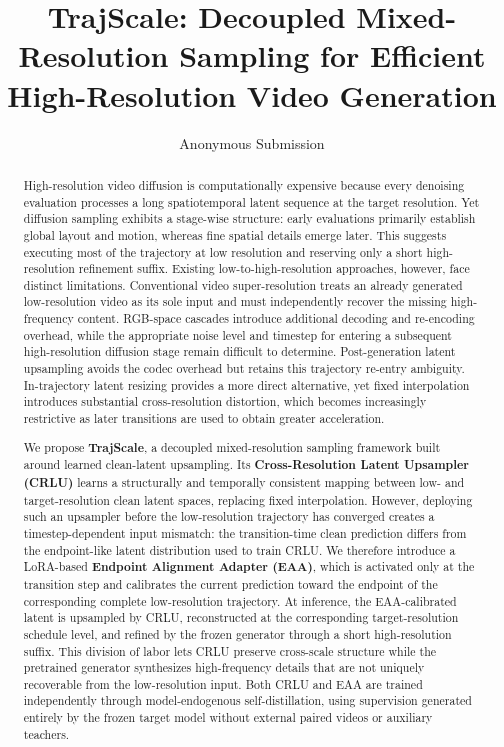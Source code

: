 \documentclass[letterpaper]{article} %
\title{TrajScale: Decoupled Mixed-Resolution Sampling for Efficient High-Resolution Video Generation}
\author{Anonymous Submission}
\begin{document}
\maketitle

\begin{abstract}
High-resolution video diffusion is computationally expensive because every denoising evaluation processes a
 long spatiotemporal latent sequence at the target resolution. Yet diffusion sampling exhibits a stage-wise structure:
 early evaluations primarily establish global layout and motion, whereas fine spatial details emerge later.
 This suggests executing most of the trajectory at low resolution and reserving only a short
 high-resolution refinement suffix. Existing low-to-high-resolution approaches, however, face distinct limitations.
 Conventional video super-resolution treats an already generated low-resolution video as its sole input and must
 independently recover the missing high-frequency content. RGB-space cascades introduce additional decoding and
 re-encoding overhead, while the appropriate noise level and timestep for entering a subsequent high-resolution diffusion
 stage remain difficult to determine. Post-generation latent upsampling avoids the codec overhead but retains this
 trajectory re-entry ambiguity. In-trajectory latent resizing provides a more direct alternative, yet fixed interpolation
 introduces substantial cross-resolution distortion, which becomes increasingly restrictive as later transitions are used
 to obtain greater acceleration.

We propose \textbf{TrajScale}, a decoupled mixed-resolution sampling framework built around learned clean-latent upsampling. Its \textbf{Cross-Resolution Latent Upsampler (CRLU)} learns a structurally and temporally consistent mapping between low- and target-resolution clean latent spaces, replacing fixed interpolation. However, deploying such an upsampler before the low-resolution trajectory has converged creates a timestep-dependent input mismatch: the transition-time clean prediction differs from the endpoint-like latent distribution used to train CRLU. We therefore introduce a LoRA-based \textbf{Endpoint Alignment Adapter (EAA)}, which is activated only at the transition step and calibrates the current prediction toward the endpoint of the corresponding complete low-resolution trajectory. At inference, the EAA-calibrated latent is upsampled by CRLU, reconstructed at the corresponding target-resolution schedule level, and refined by the frozen generator through a short high-resolution suffix. This division of labor lets CRLU preserve cross-scale structure while the pretrained generator synthesizes high-frequency details that are not uniquely recoverable from the low-resolution input. Both CRLU and EAA are trained independently through model-endogenous self-distillation, using supervision generated entirely by the frozen target model without external paired videos or auxiliary teachers.


\end{abstract}
\end{document}
